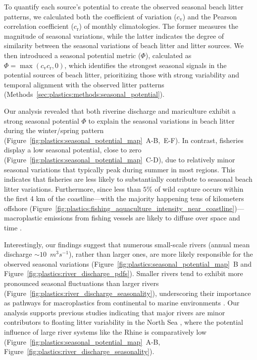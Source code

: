 To quantify each source's potential to create the observed seasonal beach litter patterns, we calculated both the coefficient of variation ($c_{\text{v}}$) and the Pearson correlation coefficient ($c_{\text{r}}$) of monthly climatologies. The former measures the magnitude of seasonal variations, while the latter indicates the degree of similarity between the seasonal variations of beach litter and litter sources. We then introduced a seasonal potential metric ($\Phi$), calculated as $\Phi = \max (c_{\text{v}}c_{\text{r}}, 0)$, which identifies the strongest seasonal signals in the potential sources of beach litter, prioritizing those with strong variability and temporal alignment with the observed litter patterns (Methods~\ref{sec:plastics:methods:seasonal_potential}).

Our analysis revealed that both riverine discharge and mariculture exhibit a strong seasonal potential $\Phi$ to explain the seasonal variations in beach litter during the winter/spring pattern (Figure~\ref{fig:plastics:seasonal_potential_map}~A-B,~E-F).  In contrast, fisheries display a low seasonal potential, close to zero (Figure~\ref{fig:plastics:seasonal_potential_map}~C-D), due to relatively minor seasonal variations that typically peak during summer in most regions. This indicates that fisheries are less likely to substantially contribute to seasonal beach litter variations. Furthermore, since less than $5\%$ of wild capture occurs within the first 4 km of the coastline---with the majority happening tens of kilometers offshore (Figure~\ref{fig:plastics:fishing_aquaculture_intensity_near_coastline})---macroplastic emissions from fishing vessels are likely to diffuse over space and time \cite{sebille_physical_2020}.

Interestingly, our findings suggest that numerous small-scale rivers (annual mean discharge $\sim 10$~$m^3s^{-1}$), rather than larger ones, are more likely responsible for the observed seasonal variations (Figure~\ref{fig:plastics:seasonal_potential_map}~B and Figure~\ref{fig:plastics:river_discharge_pdfs}). Smaller rivers tend to exhibit more pronounced seasonal fluctuations than larger rivers (Figure~\ref{fig:plastics:river_discharge_seasonality}), underscoring their importance as pathways for macroplastics from continental to marine environments \cite{gonzalez-fernandez_floating_2021}. Our analysis supports previous studies indicating that major rivers are minor contributors to floating litter variability in the North Sea \cite{thiel_spatio-temporal_2011}, where the potential influence of large river systems like the Rhine is comparatively low (Figure~\ref{fig:plastics:seasonal_potential_map}~A-B, Figure~\ref{fig:plastics:river_discharge_seasonality}).

